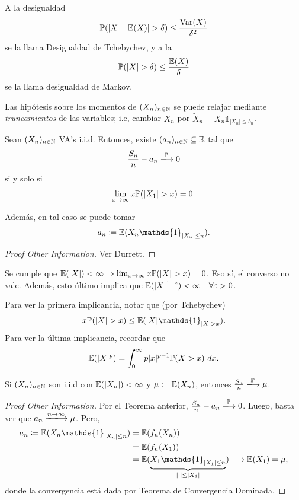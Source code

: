 \begin{note}
	A la desigualdad
	\[ \mathbb{P}(|X - \mathbb{E}(X)| > \delta) \leq \frac{\operatorname{Var}(X)}{\delta^{2}} \]
	se la llama Desigualdad de Tchebychev, y a la
	\[ \mathbb{P}(|X| > \delta) \leq \frac{\mathbb{E}(X)}{\delta} \]
	se la llama desigualdad de Markov.
\end{note}

\begin{note}
	Las hipótesis sobre los momentos de $(X_{n})_{n \in \mathbb{N}}$ se puede relajar mediante \textit{truncamientos} de las variables; i.e, cambiar $X_{n}$ por $\widetilde{X}_{n} = X_{n} \mathds{1}_{|X_{n}| \leq b_{n}}$.
\end{note}

\begin{theorem}
	Sean $(X_{n})_{n \in \mathbb{N}}$ VA's i.i.d. Entonces, existe $(a_{n})_{n \in \mathbb{N}} \subseteq \mathbb{R}$ tal que
	\[ \frac{S_{n}}{n} - a_{n} \xlongrightarrow{\mbb{P}} 0 \]
	si y solo si 
	\[ \lim_{x \to \infty} x \mathbb{P}(|X_{1}| > x) = 0. \]
	\par Además, en tal caso se puede tomar
	\[ a_{n} \coloneq \mbb{E}(X_{n} \mathds{1}_{|X_{n}| \leq n}). \]
\end{theorem}
\begin{proof}[Proof Other Information]
	Ver Durrett.
\end{proof}

\begin{remark}
	Se cumple que $\mathbb{E}(|X|) < \infty \Rightarrow \lim_{x \to \infty} x \mathbb{P}(|X| > x) = 0$. Eso sí, el converso no vale. Además, esto último implica que $\mathbb{E}(|X|^{1 - \varepsilon}) < \infty \quad \forall \varepsilon > 0$. \par
	Para ver la primera implicancia, notar que (por Tchebychev)
	\[ x \mbb{P}(|X| > x) \leq \mbb{E}(|X| \mathds{1}_{|X| > x}). \]
	Para ver la última implicancia, recordar que
	\[ \mathbb{E}(|X|^{p}) = \int_{0}^{\infty} p |x|^{p - 1} \mathbb{P}(X > x) \ dx. \]
\end{remark}

\begin{corollary}
	Si $(X_{n})_{n \in \mathbb{N}}$ son i.i.d con $\mathbb{E}(|X_{n}|) < \infty$ y $\mu \coloneq \mathbb{E}(X_{n})$, entonces $\frac{S_{n}}{n} \xlongrightarrow{\mbb{P}} \mu$.
\end{corollary}
\begin{proof}[Proof Other Information]
	Por el Teorema anterior, $\frac{S_{n}}{n} - a_{n} \xlongrightarrow{\mbb{P}} 0$. Luego, basta ver que $a_{n} \xlongrightarrow{n \to \infty} \mu$. Pero, 
	\begin{align*}
		a_{n} \coloneq \mbb{E}(X_{n} \mathds{1}_{|X_{n}| \leq n}) &= \mbb{E}(f_{n}(X_{n})) \\ 
		&= \mbb{E}(f_{n}(X_{1})) \\
		&= \mbb{E}(\underbrace{X_{1} \mathds{1}_{|X_{1}| \leq n}}_{|\cdot| \leq |X_{1}|}) \longrightarrow \mbb{E}(X_{1}) = \mu
	,\end{align*}
	donde la convergencia está dada por Teorema de Convergencia Dominada.
\end{proof}

